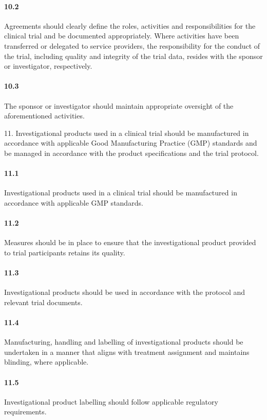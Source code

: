 \documentclass[11pt]{article}
\begin{document}
\paragraph{10.2} Agreements should clearly define the roles, activities and responsibilities for the clinical trial and be documented appropriately. Where activities have been transferred or delegated to service providers, the responsibility for the conduct of the trial, including quality and integrity of the trial data, resides with the sponsor or investigator, respectively.

\paragraph{10.3} The sponsor or investigator should maintain appropriate oversight of the aforementioned activities.

11. Investigational products used in a clinical trial should be manufactured in accordance with applicable Good Manufacturing Practice (GMP) standards and be managed in accordance with the product specifications and the trial protocol.


\paragraph{11.1} Investigational products used in a clinical trial should be manufactured in accordance with applicable GMP standards.

\paragraph{11.2} Measures should be in place to ensure that the investigational product provided to trial participants retains its quality.

\paragraph{11.3} Investigational products should be used in accordance with the protocol and relevant trial documents.

\paragraph{11.4} Manufacturing, handling and labelling of investigational products should be undertaken in a manner that aligns with treatment assignment and maintains blinding, where applicable.

\paragraph{11.5} Investigational product labelling should follow applicable regulatory requirements.
\end{document}
